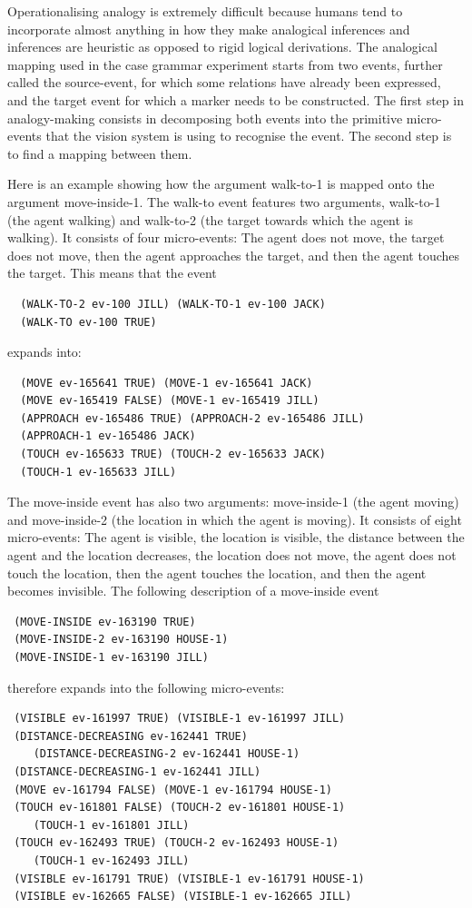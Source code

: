 Operationalising analogy is extremely difficult because humans tend to incorporate almost anything in how they 
make analogical inferences and inferences are heuristic as opposed to rigid logical derivations. The analogical 
mapping used in the case grammar experiment starts from two events, further called the source-event, for which some relations have already been expressed, and the target event for which a marker needs to be constructed. The first step in analogy-making consists in decomposing both events into the primitive micro-events that the vision system is using to recognise the 
event. The second step is to find a mapping between them. 

Here is an example showing how the argument walk-to-1 is mapped onto the argument move-inside-1.
The walk-to event features two arguments, walk-to-1 (the agent walking) and walk-to-2 (the 
target towards which the agent is walking). It consists of four micro-events: The agent does not 
move, the target does not move, then the agent approaches the target, and then the agent touches the target. 
This means that the event 
\begin{verbatim}
  (WALK-TO-2 ev-100 JILL) (WALK-TO-1 ev-100 JACK) 
  (WALK-TO ev-100 TRUE)
\end{verbatim}
expands into:
\begin{verbatim}
  (MOVE ev-165641 TRUE) (MOVE-1 ev-165641 JACK)
  (MOVE ev-165419 FALSE) (MOVE-1 ev-165419 JILL)
  (APPROACH ev-165486 TRUE) (APPROACH-2 ev-165486 JILL)
  (APPROACH-1 ev-165486 JACK)
  (TOUCH ev-165633 TRUE) (TOUCH-2 ev-165633 JACK)
  (TOUCH-1 ev-165633 JILL)
\end{verbatim}
The move-inside event has also two arguments: move-inside-1 (the agent moving) and 
move-inside-2 (the location in which the agent is moving). It consists of eight 
micro-events: The agent is visible, the location is visible, the distance between the agent and 
the location decreases, the location does not move, the agent does not touch the location, 
then the agent touches the location, and then the agent becomes invisible. The 
following description of a move-inside event
\begin{verbatim}
 (MOVE-INSIDE ev-163190 TRUE)
 (MOVE-INSIDE-2 ev-163190 HOUSE-1)
 (MOVE-INSIDE-1 ev-163190 JILL)
\end{verbatim}
therefore expands into the following micro-events:
\begin{verbatim}
 (VISIBLE ev-161997 TRUE) (VISIBLE-1 ev-161997 JILL)
 (DISTANCE-DECREASING ev-162441 TRUE) 
    (DISTANCE-DECREASING-2 ev-162441 HOUSE-1) 
 (DISTANCE-DECREASING-1 ev-162441 JILL)
 (MOVE ev-161794 FALSE) (MOVE-1 ev-161794 HOUSE-1)
 (TOUCH ev-161801 FALSE) (TOUCH-2 ev-161801 HOUSE-1) 
    (TOUCH-1 ev-161801 JILL) 
 (TOUCH ev-162493 TRUE) (TOUCH-2 ev-162493 HOUSE-1) 
    (TOUCH-1 ev-162493 JILL)
 (VISIBLE ev-161791 TRUE) (VISIBLE-1 ev-161791 HOUSE-1) 
 (VISIBLE ev-162665 FALSE) (VISIBLE-1 ev-162665 JILL)
\end{verbatim}
